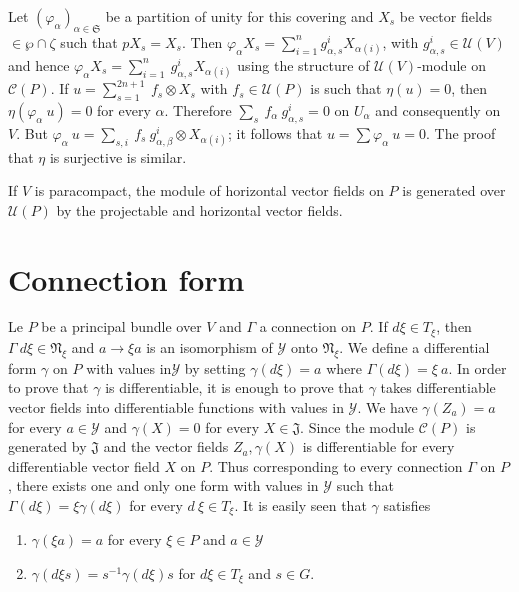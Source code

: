 Let $(\varphi_\alpha)_{\alpha \in \mathfrak{S}}$ be a partition of
unity for this covering and $X_s$ be vector fields $\in \wp \cap
\zeta$ such that $p X_s = X_s$. Then $\varphi_\alpha X_s =
\sum\limits_{i =1}^n g^i_{\alpha,s} X_{\alpha(i)}$, with
$g^i_{\alpha,s} \in \mathscr{U}(V)$ and hence $\varphi_\alpha X_s =
\sum\limits_{i=1}^n ~g^i_{\alpha, s}X_{\alpha(i)}$ using the structure
of $\mathscr{U}(V)$-module on $\mathscr{C}(P)$. If $u =
\sum\limits_{s=1}^{2n+1} ~ f_s \otimes X_s$ with $f_s \in
\mathscr{U}(P)$ is such that $\eta (u) = 0$, then $\eta
(\varphi_\alpha ~u) = 0$ for every $\alpha$. Therefore $\sum\limits_s
~f_\alpha  ~ g_{\alpha,s}^i = 0 $ on $U_\alpha$ and consequently on
$V$. But $\varphi_\alpha ~ u = \sum\limits_{s,i} ~ f_s ~
g_{\alpha,\beta}^i \otimes X_{\alpha (i)}$; it follows that $u =\sum
\varphi_\alpha ~ u = 0$. The proof that $\eta$ is surjective is
similar. 

\begin{coro*}%
  If $V$ is paracompact, the module of horizontal vector fields on $P$
  is generated over $\mathscr{U}(P)$ by the projectable and horizontal
  vector fields. 
\end{coro*}

\section{Connection form}\label{chap3:sec3} %

Le $P$ be a principal bundle over $V$ and $\Gamma$ a connection on
$P$. If $d \xi \in T_\xi$, then $\Gamma ~ d \xi \in \mathfrak{N}_\xi $
and $a \rightarrow \xi a$ is an isomorphism of $\mathscr{Y}$ onto
$\mathfrak{N}_\xi$. We define a differential form $\gamma$ on $P$ with
values in\pageoriginale $\mathscr{Y}$ by setting $\gamma(d \xi) = a$ where $\Gamma
(d \xi) = \xi ~ a$. In order to prove that $\gamma$ is differentiable,
it is enough to prove that $\gamma$ takes differentiable vector fields
into differentiable functions with values in $\mathscr{Y}$. We have
$\gamma(Z_a) = a$ for every $a \in \mathscr{Y}$ and $\gamma(X) = 0$
for every $X \in \mathfrak{J}$. Since the module $\mathscr{C}(P)$ is
generated by $\mathfrak{J}$ and the vector fields $Z_a, \gamma(X)$ is
differentiable for every differentiable vector field $X$ on $P$. Thus
corresponding to every connection $\Gamma$ on $P$, there exists one
and only one form with values in $\mathscr{Y}$ such that $\Gamma (d
\xi) = \xi \gamma (d \xi)$ for every $d ~ \xi \in T_\xi$. It is easily
seen that $\gamma$ satisfies 
\begin{enumerate}[1)]
\item $\gamma(\xi a) = a$ for every $\xi \in P$ and $a \in \mathscr{Y}$
\item $\gamma(d \xi s ) = s^{-1}\gamma (d \xi) s $ for $d \xi \in
  T_\xi$  and $s \in G$. 
\end{enumerate}

